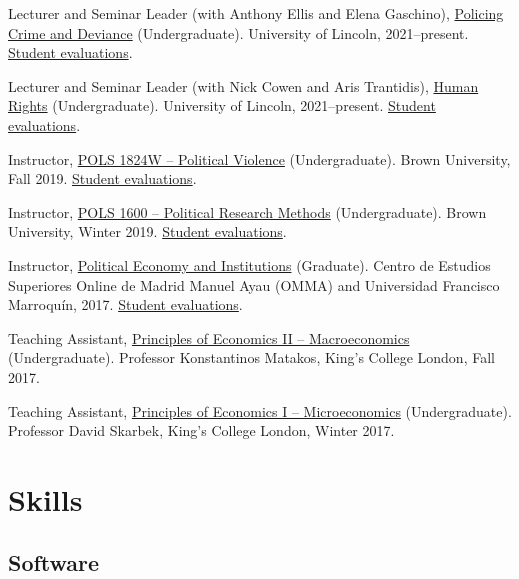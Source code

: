 \documentclass[a4paper]{article}
\renewenvironment{itemize}{
	\begin{list}{}{
			\setlength{\leftmargin}{1.5em}
		}
		}{
	\end{list}
}
\begin{document}
\begin{itemize}
\item Lecturer and Seminar Leader (with Anthony Ellis and Elena Gaschino), \href{https://blackboard.lincoln.ac.uk/ultra/courses/_182116_1/cl/outline}{Policing Crime and Deviance} (Undergraduate). University of Lincoln, 2021--present. \href{https://danilofreire.github.io/evaluations/eval-pcd-2023.xlsx}{Student evaluations}.
\item Lecturer and Seminar Leader (with Nick Cowen and Aris Trantidis), \href{https://blackboard.lincoln.ac.uk/ultra/courses/_184943_1/cl/outline}{Human Rights} (Undergraduate). University of Lincoln, 2021--present. \href{https://danilofreire.github.io/evaluations/eval-hr-2122.xlsx}{Student evaluations}.
\item Instructor, \href{https://danilofreire.github.io/pols1824w/}{POLS 1824W -- Political Violence} (Undergraduate). Brown University, Fall 2019. \href{https://danilofreire.github.io/evaluations/eval-pol-vio.pdf}{Student evaluations}.
\item Instructor, \href{https://pols1600.github.io/}{POLS 1600 -- Political Research Methods} (Undergraduate). Brown University, Winter 2019. \href{https://danilofreire.github.io/evaluations/eval-pol-meth.pdf}{Student evaluations}.
\item Instructor, \href{https://github.com/danilofreire/economia-politica-instituicoes-ufm}{Political Economy and Institutions} (Graduate). Centro de Estudios Superiores Online de Madrid Manuel Ayau (OMMA) and Universidad Francisco Marroquín, 2017. \href{https://danilofreire.github.io/evaluations/eval-ufm.pdf}{Student evaluations}.
\item Teaching Assistant, \href{https://github.com/danilofreire/core-econ}{Principles of Economics II -- Macroeconomics} (Undergraduate). Professor Konstantinos Matakos, King's College London, Fall 2017.
\item Teaching Assistant, \href{https://github.com/danilofreire/core-econ}{Principles of Economics I -- Microeconomics} (Undergraduate). Professor David Skarbek, King's College London, Winter 2017.
\end{itemize}

\section*{Skills}

\subsection*{Software}
\end{document}
